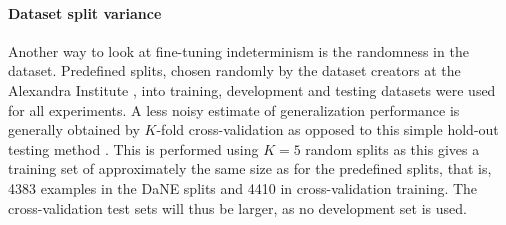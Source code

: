\documentclass[main.tex]{subfiles}
\begin{document}
\paragraph{Dataset split variance}
Another way to look at fine-tuning indeterminism is the randomness in the dataset.
Predefined splits, chosen randomly by the dataset creators at the Alexandra Institute \cite{hvingelby2020dane}, into training, development and testing datasets were used for all experiments.
A less noisy estimate of generalization performance is generally obtained by $K$-fold cross-validation as opposed to this simple hold-out testing method \cite[Sec. 1.3]{bishop2006pattern}.
This is performed using $K=5$ random splits as this gives a training set of approximately the same size as for the predefined splits, that is, 4383 examples in the DaNE splits and 4410 in cross-validation training.
The cross-validation test sets will thus be larger, as no development set is used.








\end{document}
